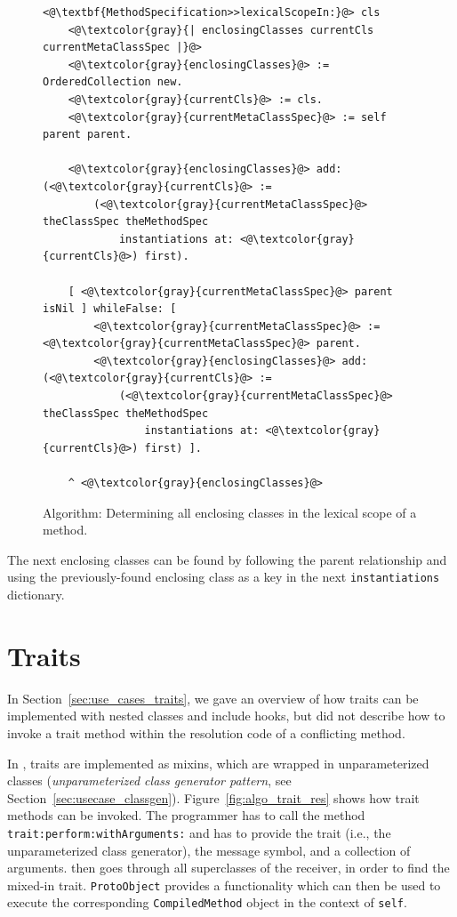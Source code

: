 \begin{figure}[!htp]
\begin{lstlisting}
<@\textbf{MethodSpecification>>lexicalScopeIn:}@> cls
    <@\textcolor{gray}{| enclosingClasses currentCls currentMetaClassSpec |}@>
    <@\textcolor{gray}{enclosingClasses}@> := OrderedCollection new.
    <@\textcolor{gray}{currentCls}@> := cls.
    <@\textcolor{gray}{currentMetaClassSpec}@> := self parent parent.

    <@\textcolor{gray}{enclosingClasses}@> add: (<@\textcolor{gray}{currentCls}@> := 
        (<@\textcolor{gray}{currentMetaClassSpec}@> theClassSpec theMethodSpec 
            instantiations at: <@\textcolor{gray}{currentCls}@>) first).

    [ <@\textcolor{gray}{currentMetaClassSpec}@> parent isNil ] whileFalse: [
        <@\textcolor{gray}{currentMetaClassSpec}@> := <@\textcolor{gray}{currentMetaClassSpec}@> parent.
        <@\textcolor{gray}{enclosingClasses}@> add: (<@\textcolor{gray}{currentCls}@> := 
            (<@\textcolor{gray}{currentMetaClassSpec}@> theClassSpec theMethodSpec 
                instantiations at: <@\textcolor{gray}{currentCls}@>) first) ].

    ^ <@\textcolor{gray}{enclosingClasses}@>
\end{lstlisting}
\caption[Algorithm: Determining the lexical scope of a method]{Algorithm: Determining all enclosing classes in the lexical scope of a method.}
\label{fig:app_det_lex_scope_algo}
\end{figure}

The next enclosing classes can be found by following the parent relationship and using the previously-found enclosing class as a key in the next \texttt{instantiations} dictionary.

\section{Traits}
\label{sec:app_traits}
In Section~\ref{sec:use_cases_traits}, we gave an overview of how traits can be implemented with nested classes and include hooks, but did not describe how to invoke a trait method within the resolution code of a conflicting method.

In \msname, traits are implemented as mixins, which are wrapped in unparameterized classes (\emph{unparameterized class generator pattern}, see Section~\ref{sec:usecase_classgen}). Figure~\ref{fig:algo_trait_res} shows how trait methods can be invoked. The programmer has to call the method \texttt{trait:perform:withArguments:} and has to provide the trait (i.e., the unparameterized class generator), the message symbol, and a collection of arguments. \msname then goes through all superclasses of the receiver, in order to find the mixed-in trait. \texttt{ProtoObject} provides a functionality which can then be used to execute the corresponding \texttt{CompiledMethod} object in the context of \texttt{self}.

